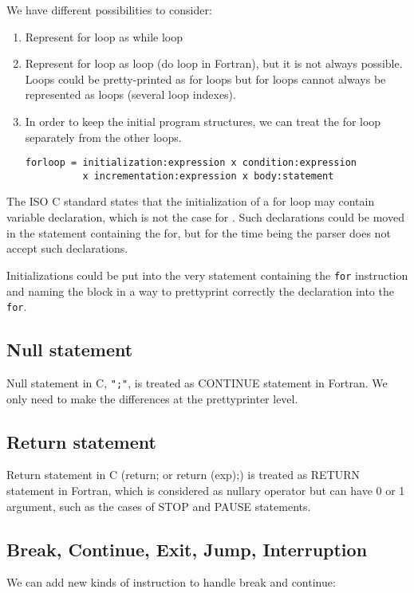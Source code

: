 \documentclass[a4paper]{report}
\begin{document}
We have different possibilities to consider:
\begin{enumerate}
\item Represent for loop as while loop
\item Represent for loop as loop (do loop in Fortran), but it is not always
  possible. Loops could be pretty-printed as for loops but for loops cannot
  always be represented as loops (several loop indexes).
\item In order to keep the initial program structures, we can treat the for loop
separately from the other loops. 

\begin{verbatim}
forloop = initialization:expression x condition:expression
          x incrementation:expression x body:statement
\end{verbatim}
\end{enumerate}

The ISO C standard \cite{ISOC} states that the initialization of a for
loop may contain variable declaration, which is not the case for
\cite{Kern78}. Such declarations could be moved in the statement
containing the for, but for the time being the parser does not accept
such declarations.

Initializations could be put into the very statement containing the
\texttt{for} instruction and naming the block in a way to prettyprint
correctly the declaration into the \texttt{for}.

\subsection{Null statement}
Null statement in C, \verb/";"/, is treated as CONTINUE statement in
Fortran. We only need to make the differences at the prettyprinter
level.

\subsection{Return statement}
Return statement in C (return; or return (exp);) is treated as RETURN statement in Fortran, which is
considered as nullary operator but can have 0 or 1 argument, such as the
cases of STOP and PAUSE statements. 

\subsection{Break, Continue, Exit, Jump, Interruption}

We can add new kinds of instruction to handle break and continue: 
\end{document}
